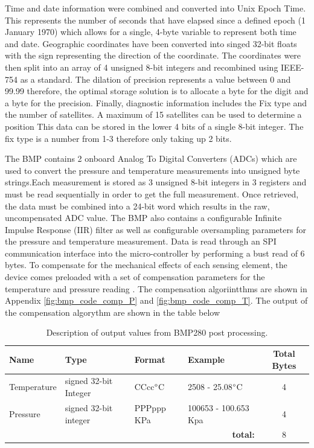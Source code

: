  Time and date information were combined and converted into Unix Epoch Time. This represents the number of seconds that have elapsed since a defined epoch (1 January 1970) which allows for a single, 4-byte variable to represent both time and date. Geographic coordinates have been converted into singed 32-bit floats with the sign representing the direction of the coordinate. The coordinates were then split into an array of 4 unsigned 8-bit integers and recombined using IEEE-754 as a standard. The dilation of precision represents a value between 0 and 99.99 therefore, the optimal storage solution is to allocate a byte for the digit and a byte for the precision. Finally, diagnostic information includes the Fix type and the number of satellites. A maximum of 15 satellites can be used to determine a position This data can be stored in the lower 4 bits of a single 8-bit integer. The fix type is a number from 1-3 therefore only taking up 2 bits.\par 
 
 
The BMP contains 2 onboard Analog To Digital Converters (ADCs) which are used to convert the pressure and temperature measurements into unsigned byte strings.Each measurement is stored as 3 unsigned 8-bit integers in 3 registers and must be read sequentially in order to get the full measurement. Once retrieved, the data must be combined into a 24-bit word which results in the raw, uncompensated ADC value. The BMP also contains a configurable Infinite Impulse Response (IIR) filter as well as configurable oversampling parameters for the pressure and temperature measurement. Data is read through an SPI communication interface into the micro-controller by performing a bust read of 6 bytes. To compensate for the mechanical effects of each sensing element, the device comes preloaded with a set of compensation parameters for the temperature and pressure reading \cite{BMP280_Datasheet}. The compensation algoriintthms are shown in Appendix \ref{fig:bmp_code_comp_P} and \ref{fig:bmp_code_comp_T}. The output of the compensation algorythm are shown in the table below

\begin{table}[H]
    \centering
    \caption{Description of output values from BMP280 post processing.}
    \begin{tabular}{|l|l|l|l|c|}
    \hline
         \textbf{Name }& \textbf{Type} &\textbf{Format} & \textbf{Example} & \textbf{Total Bytes}   \\
         \hline
          Temperature & signed 32-bit Integer & CCcc$\degree$C & 2508 - 25.08$\degree$C & 4\\
          \hline
          Pressure & signed 32-bit integer & PPPppp KPa & 100653 - 100.653 Kpa & 4\\
          \hline
          \multicolumn{4}{r}{\textbf{total:}} & \multicolumn{1}{c}{8}\\
          \cline{5-5}
          \cline{5-5}
    \end{tabular}

    \label{tab:BMP_output}
\end{table}

